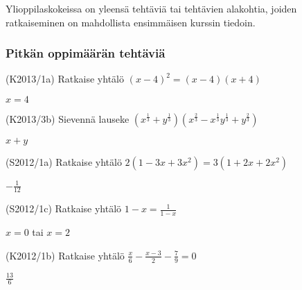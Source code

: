 Ylioppilaskokeissa on yleensä tehtäviä tai tehtävien alakohtia, joiden ratkaiseminen on mahdollista ensimmäisen kurssin tiedoin.






\subsubsection*{Pitkän oppimäärän tehtäviä}

\begin{tehtava} (K2013/1a)  Ratkaise yhtälö
						$(x-4)^2=(x-4)(x+4)$
				\begin{vastaus}
				$x=4$
				\end{vastaus}
\end{tehtava}

\begin{tehtava}
	(K2013/3b)  Sievennä lauseke 
						$(x^\frac{1}{3} + y^\frac{1}{3})(x^\frac{2}{3} - x^\frac{1}{3}y^\frac{1}{3} + y^\frac{2}{3})$
						\begin{vastaus}
				$x+y$
				\end{vastaus}
						\end{tehtava}
						
\begin{tehtava} (S2012/1a)  Ratkaise yhtälö
						$2(1-3x+3x^2)=3(1+2x+2x^2)$
						\begin{vastaus}
				$-\frac{1}{12}$
				\end{vastaus}
\end{tehtava}

\begin{tehtava}(S2012/1c)  Ratkaise yhtälö
						$1-x=\frac{1}{1-x}$
						\begin{vastaus}
				$x=0$ tai $x=2$
				\end{vastaus}
\end{tehtava}

\begin{tehtava}(K2012/1b)  Ratkaise yhtälö
                        $\frac{x}{6} - \frac{x-3}{2} - \frac{7}{9} = 0 $ 
                        \begin{vastaus}
				$\frac{13}{6}$
				\end{vastaus}
\end{tehtava}

